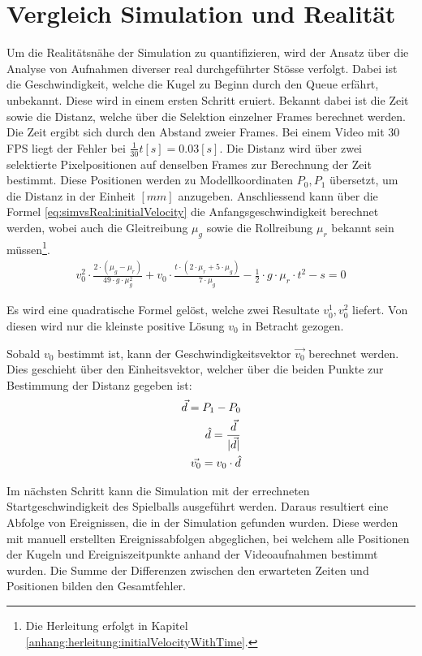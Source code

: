\section{Vergleich Simulation und Realität}
Um die Realitätsnähe der Simulation zu quantifizieren, wird der Ansatz über die Analyse von Aufnahmen diverser real
durchgeführter Stösse verfolgt. Dabei ist die Geschwindigkeit, welche die Kugel zu Beginn durch den Queue erfährt,
unbekannt. Diese wird in einem ersten Schritt eruiert. Bekannt dabei ist die Zeit sowie die Distanz, welche über die
Selektion einzelner Frames berechnet werden. Die Zeit ergibt sich durch den Abstand zweier Frames. Bei einem Video mit
30 FPS liegt der Fehler bei $\frac{1}{30} t [s] = 0.03 [s]$. Die Distanz wird über zwei selektierte Pixelpositionen
auf denselben Frames zur Berechnung der Zeit bestimmt. Diese Positionen werden zu Modellkoordinaten $P_0, P_1$
übersetzt\cite{project2:pixel_to_model_coordinates}, um die
Distanz in der Einheit $[mm]$ anzugeben. Anschliessend kann über die Formel \ref{eq:simvsReal:initialVelocity} die Anfangsgeschwindigkeit berechnet
werden, wobei auch die Gleitreibung $\mu_g$ sowie die Rollreibung $\mu_r$ bekannt sein müssen\footnote{Die Herleitung
erfolgt in Kapitel \ref{anhang:herleitung:initialVelocityWithTime}.}.
\begin{align}
    v_0^2 \cdot \frac{2 \cdot (\mu_g - \mu_r)}{49 \cdot g \cdot \mu_g^2} + v_0 \cdot \frac{t \cdot (2 \cdot \mu_r + 5 \cdot \mu_g)}{7 \cdot \mu_g} - \frac{1}{2} \cdot g \cdot \mu_r \cdot t^2 - s = 0\label{eq:simvsReal:initialVelocity}
\end{align}

Es wird eine quadratische Formel gelöst, welche zwei Resultate $v^1_0, v^2_0$ liefert. Von diesen wird nur die
kleinste positive Lösung $v_0$ in Betracht gezogen.

Sobald $v_0$ bestimmt ist, kann der Geschwindigkeitsvektor $\vec{v_0}$ berechnet werden. Dies geschieht über den Einheitsvektor,
welcher über die beiden Punkte zur Bestimmung der Distanz gegeben ist:
\begin{align}
    \vec{d} = P_1 - P_0\\
    \hat{d} = \frac{\vec{d}}{\lvert \vec{d} \rvert}\\
    \vec{v_0} = v_0 \cdot \hat{d}
\end{align}

Im nächsten Schritt kann die Simulation mit der errechneten Startgeschwindigkeit des Spielballs ausgeführt werden.
Daraus resultiert eine Abfolge von Ereignissen, die in der Simulation gefunden wurden.
Diese werden mit manuell erstellten Ereignissabfolgen abgeglichen, bei welchem alle Positionen der Kugeln und Ereigniszeitpunkte
anhand der Videoaufnahmen bestimmt wurden. Die Summe der Differenzen zwischen den erwarteten Zeiten und Positionen bilden den Gesamtfehler.

